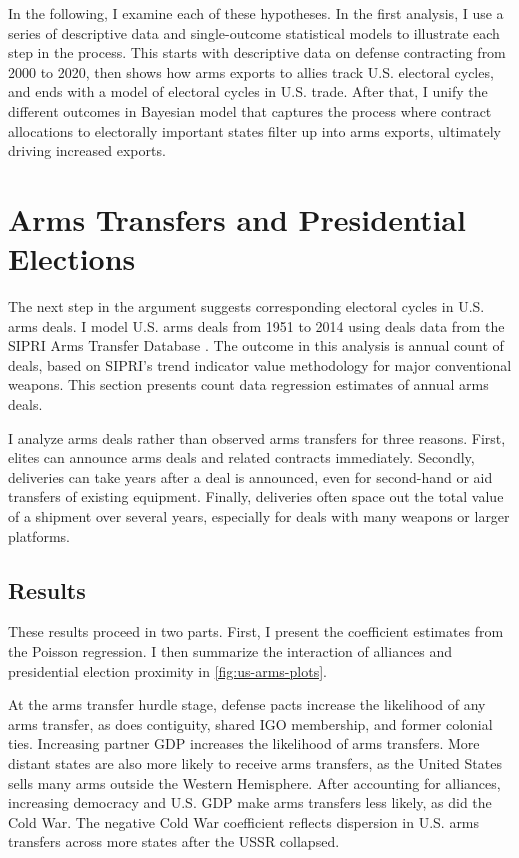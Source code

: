 \documentclass[12pt]{article}
\begin{document}
In the following, I examine each of these hypotheses. 
In the first analysis, I use a series of descriptive data and single-outcome statistical models to illustrate each step in the process.
This starts with descriptive data on defense contracting from 2000 to 2020, then shows how arms exports to allies track U.S. electoral cycles, and ends with a model of electoral cycles in U.S. trade. 
After that, I unify the different outcomes in Bayesian model that captures the process where contract allocations to electorally important states filter up into arms exports, ultimately driving increased exports.



\section{Arms Transfers and Presidential Elections}


The next step in the argument suggests corresponding electoral cycles in U.S. arms deals. 
I model U.S. arms deals from 1951 to 2014 using deals data from the SIPRI Arms Transfer Database \citep{SIPRI2021}.
The outcome in this analysis is annual count of deals, based on SIPRI's trend indicator value methodology for major conventional weapons.
This section presents count data regression estimates of annual arms deals. 

I analyze arms deals rather than observed arms transfers for three reasons.
First, elites can announce arms deals and related contracts immediately. 
Secondly, deliveries can take years after a deal is announced, even for second-hand or aid transfers of existing equipment. 
Finally, deliveries often space out the total value of a shipment over several years, especially for deals with many weapons or larger platforms. 




\subsection{Results}


These results proceed in two parts.
First, I present the coefficient estimates from the Poisson regression. 
I then summarize the interaction of alliances and presidential election proximity in \autoref{fig:us-arms-plots}.


At the arms transfer hurdle stage, defense pacts increase the likelihood of any arms transfer, as does contiguity, shared IGO membership, and former colonial ties.
Increasing partner GDP increases the likelihood of arms transfers.
More distant states are also more likely to receive arms transfers, as the United States sells many arms outside the Western Hemisphere. 
After accounting for alliances, increasing democracy and U.S. GDP make arms transfers less likely, as did the Cold War. 
The negative Cold War coefficient reflects dispersion in U.S. arms transfers across more states after the USSR collapsed.
\end{document}
